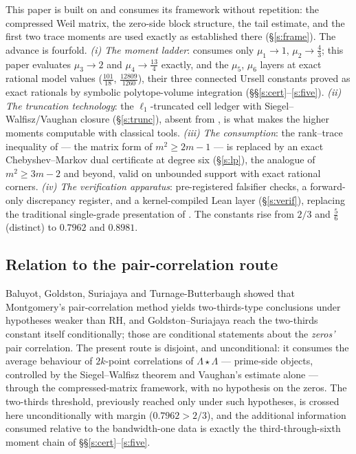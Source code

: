\documentclass[11pt]{article}
\numberwithin{equation}{section}
\theoremstyle{definition}
\theoremstyle{remark}
\newcommand{\LL}{\Lambda}
\begin{document}
This paper is built on \cite{C26} and consumes its framework
without repetition: the compressed Weil matrix, the zero-side
block structure, the tail estimate, and the first two trace
moments are used exactly as established there
(\S\ref{s:frame}). The advance is fourfold. \emph{(i) The
moment ladder}: \cite{C26} consumes only
$\mu_1\to1$, $\mu_2\to\tfrac43$; this paper evaluates
$\mu_3\to2$ and $\mu_4\to\tfrac{13}4$ exactly, and the
$\mu_5$, $\mu_6$ layers at exact rational model values
($\tfrac{101}{18}$, $\tfrac{12809}{1260}$), their three
connected Ursell constants proved as exact rationals by
symbolic polytope-volume integration
(\S\S\ref{s:cert}--\ref{s:five}). \emph{(ii)
The truncation technology}: the $\ell_1$-truncated cell ledger
with Siegel--Walfisz/Vaughan closure (\S\ref{s:trunc}), absent
from \cite{C26}, is what makes the higher moments computable
with classical tools. \emph{(iii) The consumption}: the
rank--trace inequality of \cite[Lem.~3.2]{C26} --- the matrix
form of $m^{2}\ge2m-1$ --- is replaced by an exact
Chebyshev--Markov dual certificate at degree six
(\S\ref{s:lp}), the analogue of $m^{2}\ge3m-2$ and beyond,
valid on unbounded support with exact rational corners.
\emph{(iv) The verification apparatus}: pre-registered
falsifier checks, a forward-only discrepancy register, and a
kernel-compiled Lean layer (\S\ref{s:verif}), replacing the
traditional single-grade presentation of \cite{C26}. The
constants rise from $2/3$ and $\tfrac56$ (distinct) to
$0.7962$ and $0.8981$.

\subsection*{Relation to the pair-correlation route}

Baluyot, Goldston, Suriajaya and Turnage-Butterbaugh \cite{BGST}
showed that Montgomery's pair-correlation method yields
two-thirds-type conclusions under hypotheses weaker than RH, and
Goldston--Suriajaya \cite{GS} reach the two-thirds constant
itself conditionally; those are conditional statements about the
\emph{zeros'} pair correlation. The present route is disjoint,
and unconditional: it consumes the average behaviour of
$2k$-point correlations of $\LL\star\LL$ --- prime-side
objects, controlled by the Siegel--Walfisz theorem and Vaughan's
estimate alone --- through the compressed-matrix framework, with
no hypothesis on the zeros. The two-thirds threshold, previously
reached only under such hypotheses, is crossed here
unconditionally with margin ($0.7962>2/3$), and the additional
information consumed relative to the bandwidth-one data is
exactly the third-through-sixth moment chain of
\S\S\ref{s:cert}--\ref{s:five}.
\end{document}

